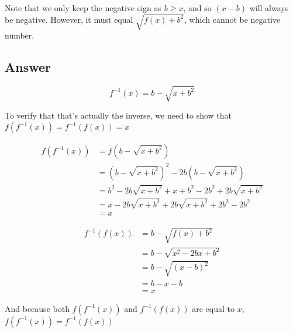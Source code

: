 \documentclass[12pt]{article} %
\begin{document}
\begin{homeworkProblem}
    Note that we only keep the negative sign as $b \geq x$, and so $(x - b)$ will always be negative.
    However, it must equal $\sqrt{f(x) + b^2}$, which cannot be negative number.

    \subsection*{Answer}
    $$
        f^{-1}(x) = b - \sqrt{x + b^2}
    $$

    To verify that that's actually the inverse, we need to show that $f(f^{-1}(x)) = f^{-1}(f(x)) = x$

    \begin{align*}
        f(f^{-1}(x))
         & = f(b - \sqrt{x + b^2})                                      \\
         & = (b - \sqrt{x + b^2})^2 - 2b(b - \sqrt{x + b^2})            \\
         & = b^2 - 2b\sqrt{x + b^2} + x + b^2 - 2b^2 + 2b\sqrt{x + b^2} \\
         & = x - 2b\sqrt{x + b^2} + 2b\sqrt{x + b^2} +  2b^2 - 2b^2     \\
         & = x
    \end{align*}

    \begin{align*}
        f^{-1}(f(x))
         & = b - \sqrt{f(x) + b^2}      \\
         & = b - \sqrt{x^2 - 2bx + b^2} \\
         & = b - \sqrt{(x - b)^2}       \\
         & = b - x - b                  \\
         & = x
    \end{align*}

    And because both $f(f^{-1}(x))$ and $f^{-1}(f(x))$ are equal to $x$, $f(f^{-1}(x)) = f^{-1}(f(x))$

\end{homeworkProblem}

\pagebreak
\end{document}
